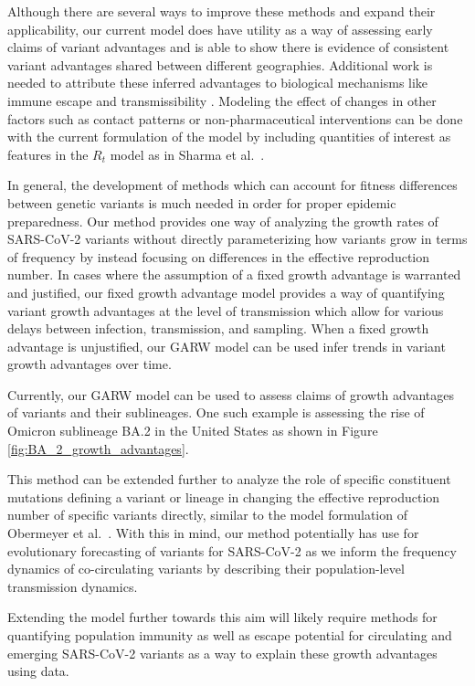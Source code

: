 \documentclass[11pt,oneside,letterpaper]{article}
\begin{document}
Although there are several ways to improve these methods and expand their applicability, our current model does have utility as a way of assessing early claims of variant advantages and is able to show there is evidence of consistent variant advantages shared between different geographies.
Additional work is needed to attribute these inferred advantages to biological mechanisms like immune escape and transmissibility \cite{tao2021biological}.
Modeling the effect of changes in other factors such as contact patterns or non-pharmaceutical interventions can be done with the current formulation of the model by including quantities of interest as features in the $R_{t}$ model as in Sharma et al.\ \cite{Sharma2021}.

In general, the development of methods which can account for fitness differences between genetic variants is much needed in order for proper epidemic preparedness.
Our method provides one way of analyzing the growth rates of SARS-CoV-2 variants without directly parameterizing how variants grow in terms of frequency by instead focusing on differences in the effective reproduction number.
In cases where the assumption of a fixed growth advantage is warranted and justified, our fixed growth advantage model provides a way of quantifying variant growth advantages at the level of transmission which allow for various delays between infection, transmission, and sampling.
When a fixed growth advantage is unjustified, our GARW model can be used infer trends in variant growth advantages over time.

Currently, our GARW model can be used to assess claims of growth advantages of variants and their sublineages. One such example is assessing the rise of Omicron sublineage BA.2 in the United States as shown in Figure \ref{fig:BA_2_growth_advantages}.

This method can be extended further to analyze the role of specific constituent mutations defining a variant or lineage in changing the effective reproduction number of specific variants directly, similar to the model formulation of Obermeyer et al.\ \cite{Obermeyer2021}.
With this in mind, our method potentially has use for evolutionary forecasting of variants for SARS-CoV-2 as we inform the frequency dynamics of co-circulating variants by describing their population-level transmission dynamics.

Extending the model further towards this aim will likely require methods for quantifying population immunity as well as escape potential for circulating and emerging SARS-CoV-2 variants as a way to explain these growth advantages using data.
\end{document}

